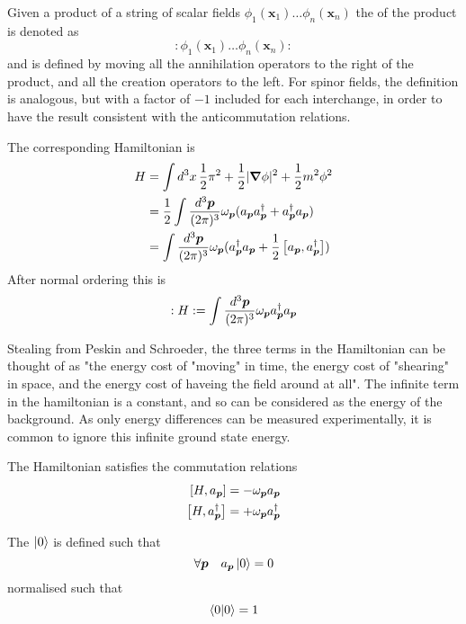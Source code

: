 \documentclass{article}
\begin{document}
\begin{definition}
Given a product of a string of scalar fields $\phi_1(\bm{x}_1)\dots\phi_n(\bm{x}_n)$ the  of the product is denoted as 
\[
:\phi_1(\bm{x}_1)\dots\phi_n(\bm{x}_n):
\]
and is defined by moving all the annihilation operators to the right of the product, and all the creation operators to the left. For spinor fields, the definition is analogous, but with a factor of $-1$ included for each interchange, in order to have the result consistent with the anticommutation relations. 
\end{definition}

\begin{theorem}
The corresponding Hamiltonian is 
\begin{align*}
    H &= \int d^3x \, \frac{1}{2}\pi^2+\frac{1}{2}|\grad\phi|^2+\frac{1}{2}m^2\phi^2 \\
    &= \frac{1}{2} \int \tmeas \omega_{\bm{p}} (a_{\bm{p}}a_{\bm{p}}^\dagger+a_{\bm{p}}^\dagger a_{\bm{p}}) \\
    &= \int \tmeas \omega_{\bm{p}} ( a_{\bm{p}}^\dagger a_{\bm{p}} +\frac{1}{2}\comm[a_{\bm{p}}]{a_{\bm{p}}^\dagger})
\end{align*}
After normal ordering this is 
\[
:H:=\int\tmeas \omega_{\bm{p}} a_{\bm{p}}^\dagger a_{\bm{p}}
\]
\end{theorem}

\begin{idea}
Stealing from Peskin and Schroeder, the three terms in the Hamiltonian can be thought of as "the energy cost of "moving" in time, the energy cost of "shearing" in space, and the energy cost of haveing the field around at all". The infinite term in the hamiltonian is a constant, and so can be considered as the energy of the background. As only energy differences can be measured experimentally, it is common to ignore this infinite ground state energy. 
\end{idea}

\begin{theorem}
The Hamiltonian satisfies the commutation relations
\begin{align*}
    \comm[H]{a_{\bm{p}}} &= -\omega_{\bm{p}} a_{\bm{p}} \\ 
    \comm[H]{a_{\bm{p}}^\dagger} &= +\omega_{\bm{p}} a_{\bm{p}}^\dagger
\end{align*}
\end{theorem}

\begin{definition}[Vacuum]
The  $\ket{0}$ is defined such that 
\[
\forall \bm{p} \quad a_{\bm{p}} \ket{0} = 0
\]
normalised such that 
\[
\braket{0|0}=1
\]
\end{definition}
\end{document}
